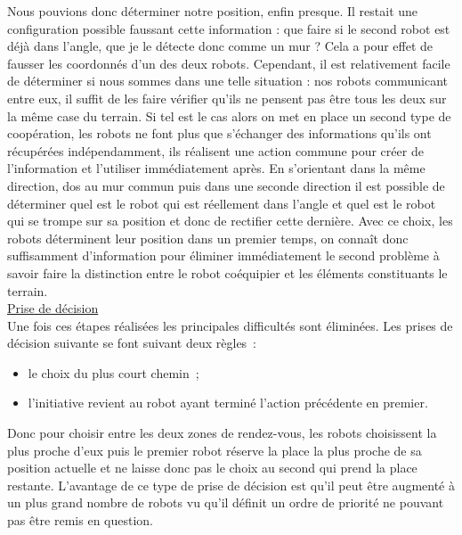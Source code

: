 \documentclass{article}
\begin{document}
Nous pouvions donc déterminer notre position, enfin presque. Il restait une configuration possible faussant cette information : que faire si le second robot est déjà dans l'angle, que je le détecte donc comme un mur ? Cela a pour effet de fausser les coordonnés d'un des deux robots. Cependant, il est relativement facile de déterminer si nous sommes dans une telle situation : nos robots communicant entre eux, il suffit de les faire vérifier qu'ils ne pensent pas être tous les deux sur la même case du terrain. Si tel est le cas alors on met en place un second type de coopération, les robots ne font plus que s'échanger des informations qu'ils ont récupérées indépendamment, ils réalisent une action commune pour créer de l'information et l'utiliser immédiatement après. En s'orientant dans la même direction, dos au mur commun puis dans une seconde direction il est possible  de déterminer quel est le robot qui est réellement dans l'angle et quel est le robot qui se trompe sur sa position et donc de rectifier cette dernière. Avec ce choix, les robots déterminent leur position dans un premier temps, on connaît donc suffisamment d'information pour éliminer immédiatement le second problème à savoir faire la distinction entre le robot coéquipier et les éléments constituants le terrain. \\

\underline{Prise de décision} \\

Une fois ces étapes réalisées les principales difficultés sont éliminées. Les prises de décision suivante se font suivant deux règles~: \\

\begin{itemize}
  \item le choix du plus court chemin~;
  \item l'initiative revient au robot ayant terminé l'action précédente en premier. \\
\end{itemize}

Donc pour choisir entre les deux zones de rendez-vous, les robots choisissent la plus proche d'eux puis le premier robot réserve la place la plus proche de sa position actuelle et ne laisse donc pas le choix au second qui prend la place restante. L'avantage de ce type de prise de décision est qu'il peut être augmenté à un plus grand nombre de robots vu qu'il définit un ordre de priorité ne pouvant pas être remis en question.
\end{document}
